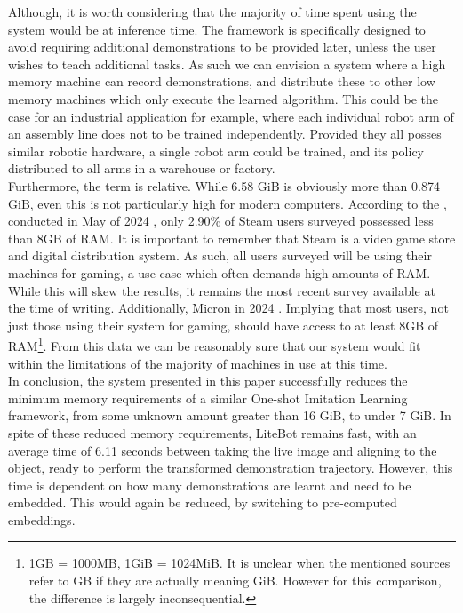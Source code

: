 Although, it is worth considering that the majority of time spent using the system would be at inference time. The framework is specifically designed to avoid requiring additional demonstrations to be provided later, unless the user wishes to teach additional tasks. As such we can envision a system where a high memory machine can record demonstrations, and distribute these to other low memory machines which only execute the learned algorithm. This could be the case for an industrial application for example, where each individual robot arm of an assembly line does not to be trained independently. Provided they all posses similar robotic hardware, a single robot arm could be trained, and its policy distributed to all arms in a warehouse or factory.\\

Furthermore, the term  is relative. While 6.58 GiB is obviously more than 0.874 GiB, even this is not particularly high for modern computers. According to the , conducted in May of 2024 \cite{steam-RAM}, only 2.90\% of Steam users surveyed possessed less than 8GB of RAM. It is important to remember that Steam is a video game store and digital distribution system. As such, all users surveyed will be using their machines for gaming, a use case which often demands high amounts of RAM. While this will skew the results, it remains the most recent survey available at the time of writing. Additionally, Micron  in 2024 \cite{RAM-req}. Implying that most users, not just those using their system for gaming, should have access to at least 8GB of RAM\footnote{1GB = 1000MB,  1GiB = 1024MiB. It is unclear when the mentioned sources refer to GB if they are actually meaning GiB. However for this comparison, the difference is largely inconsequential.}. From this data we can be reasonably sure that our system would fit within the limitations of the majority of machines in use at this time.\\

In conclusion, the system presented in this paper successfully reduces the minimum memory requirements of a similar One-shot Imitation Learning framework, from some unknown amount greater than 16 GiB, to under 7 GiB. In spite of these reduced memory requirements, LiteBot remains fast, with an average time of 6.11 seconds between taking the live image and aligning to the object, ready to perform the transformed demonstration trajectory. However, this time is dependent on how many demonstrations are learnt and need to be embedded. This would again be reduced, by switching to pre-computed embeddings.



